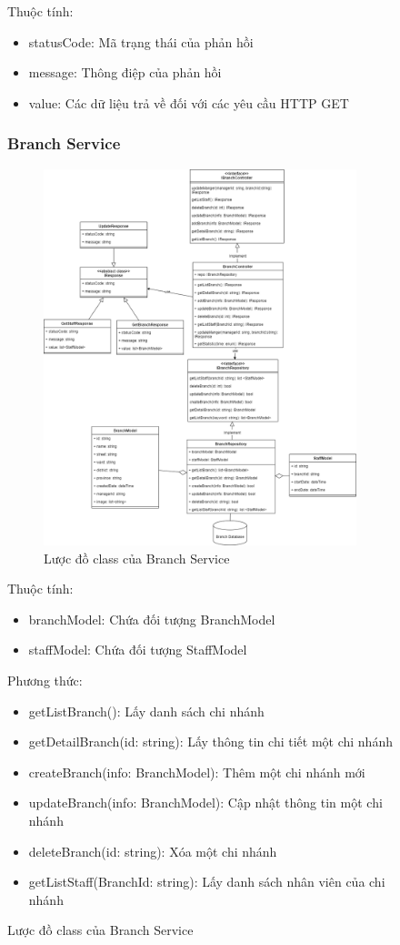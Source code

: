 \begin{figure}[!htp]
Thuộc tính:
\begin{itemize}
	\item statusCode: Mã trạng thái của phản hồi
	\item message: Thông điệp của phản hồi
	\item value: Các dữ liệu trả về đối với các yêu cầu HTTP GET
\end{itemize}



\subsubsection{Branch Service}
\begin{figure}[!htp]
	\centering
	\includegraphics[width=10cm]{img/Architecture/service/BranchService.png}
	\newline
	\caption{Lược đồ class của Branch Service}
\end{figure}

Thuộc tính:
\begin{itemize}
	\item branchModel: Chứa đối tượng BranchModel
	\item staffModel: Chứa đối tượng StaffModel
\end{itemize}
Phương thức:
\begin{itemize}
	\item getListBranch(): Lấy danh sách chi nhánh
	\item getDetailBranch(id: string): Lấy thông tin chi tiết một chi nhánh
	\item createBranch(info: BranchModel): Thêm một chi nhánh mới
	\item updateBranch(info: BranchModel): Cập nhật thông tin một chi nhánh
	\item deleteBranch(id: string): Xóa một chi nhánh
	\item getListStaff(BranchId: string): Lấy danh sách nhân viên của chi nhánh
\end{itemize}


\end{figure}
